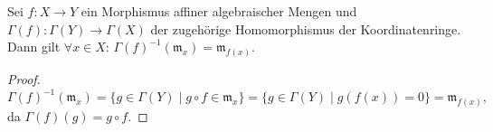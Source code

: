 \begin{prop}
  \label{prop:funktiorialitaet-specm}
  Sei $f:X\rightarrow Y$ ein Morphismus affiner algebraischer Mengen und $\Gamma(f):\Gamma(Y)\rightarrow\Gamma(X)$
  der zugehörige Homomorphismus der Koordinatenringe. Dann gilt $\forall x\in X$:
  $\Gamma(f)^{-1}(\mathfrak{m}_{x})=\mathfrak{m}_{f(x)}$.
\end{prop}
\begin{proof}
  \[
    \Gamma(f)^{-1}(\mathfrak{m}_{x})=\{g\in\Gamma(Y)\mid g\circ f \in \mathfrak{m}_{x}\}=\{g\in\Gamma(Y)\mid g(f(x)) = 0 \} = \mathfrak{m}_{f(x)},
  \]
  da $\Gamma(f)(g) =g \circ f$.
\end{proof}

